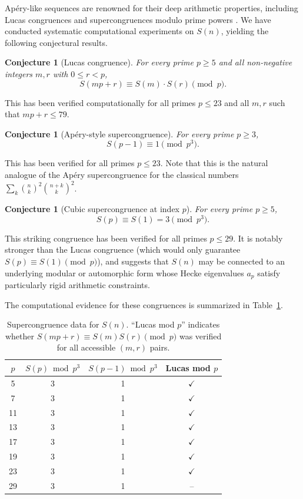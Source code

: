 \documentclass[11pt, a4paper]{article}
\newtheorem{conjecture}[theorem]{Conjecture}
\begin{document}
Ap\'ery-like sequences are renowned for their deep arithmetic properties, including Lucas congruences and supercongruences modulo prime powers \cite{Straub2014, Osburn2016}. We have conducted systematic computational experiments on $S(n)$, yielding the following conjectural results.

\begin{conjecture}[Lucas congruence]\label{conj:lucas}
For every prime $p \ge 5$ and all non-negative integers $m, r$ with $0 \le r < p$,
\[
  S(mp + r) \equiv S(m) \cdot S(r) \pmod{p}.
\]
\end{conjecture}

This has been verified computationally for all primes $p \le 23$ and all $m, r$ such that $mp+r \le 79$.

\begin{conjecture}[Ap\'ery-style supercongruence]\label{conj:apery}
For every prime $p \ge 3$,
\[
  S(p-1) \equiv 1 \pmod{p^3}.
\]
\end{conjecture}

This has been verified for all primes $p \le 23$. Note that this is the natural analogue of the Ap\'ery supercongruence for the classical numbers $\sum_k \binom{n}{k}^2\binom{n+k}{k}^2$.

\begin{conjecture}[Cubic supercongruence at index $p$]\label{conj:cubic}
For every prime $p \ge 5$,
\[
  S(p) \equiv S(1) = 3 \pmod{p^3}.
\]
\end{conjecture}

This striking congruence has been verified for all primes $p \le 29$. It is notably stronger than the Lucas congruence (which would only guarantee $S(p) \equiv S(1) \pmod{p}$), and suggests that $S(n)$ may be connected to an underlying modular or automorphic form whose Hecke eigenvalues $a_p$ satisfy particularly rigid arithmetic constraints.

The computational evidence for these congruences is summarized in Table~\ref{tab:cong}.
\begin{table}[h]
\centering
\begin{tabular}{@{}cccc@{}}
\toprule
$p$ & $S(p) \bmod p^3$ & $S(p-1) \bmod p^3$ & Lucas mod $p$ \\
\midrule
5  & 3 & 1 & $\checkmark$ \\
7  & 3 & 1 & $\checkmark$ \\
11 & 3 & 1 & $\checkmark$ \\
13 & 3 & 1 & $\checkmark$ \\
17 & 3 & 1 & $\checkmark$ \\
19 & 3 & 1 & $\checkmark$ \\
23 & 3 & 1 & $\checkmark$ \\
29 & 3 & 1 & -- \\
\bottomrule
\end{tabular}
\caption{Supercongruence data for $S(n)$. ``Lucas mod $p$'' indicates whether $S(mp+r) \equiv S(m)S(r) \pmod{p}$ was verified for all accessible $(m,r)$ pairs.}
\label{tab:cong}
\end{table}
\end{document}
